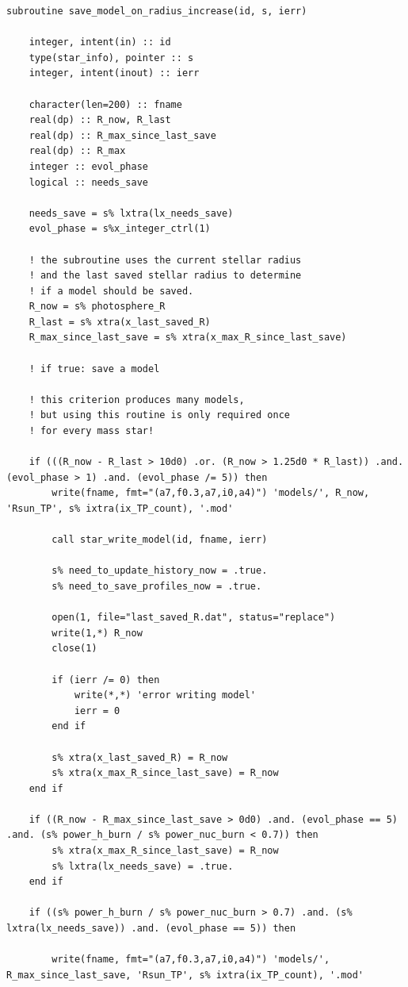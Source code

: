 \documentclass[a4paper,10pt]{article}
\begin{document}
\begin{verbatim}
subroutine save_model_on_radius_increase(id, s, ierr)

    integer, intent(in) :: id
    type(star_info), pointer :: s
    integer, intent(inout) :: ierr

    character(len=200) :: fname
    real(dp) :: R_now, R_last
    real(dp) :: R_max_since_last_save
    real(dp) :: R_max
    integer :: evol_phase
    logical :: needs_save

    needs_save = s% lxtra(lx_needs_save)
    evol_phase = s%x_integer_ctrl(1)

    ! the subroutine uses the current stellar radius 
    ! and the last saved stellar radius to determine
    ! if a model should be saved.
    R_now = s% photosphere_R
    R_last = s% xtra(x_last_saved_R)
    R_max_since_last_save = s% xtra(x_max_R_since_last_save)

    ! if true: save a model

    ! this criterion produces many models, 
    ! but using this routine is only required once
    ! for every mass star!
    
    if (((R_now - R_last > 10d0) .or. (R_now > 1.25d0 * R_last)) .and. (evol_phase > 1) .and. (evol_phase /= 5)) then
        write(fname, fmt="(a7,f0.3,a7,i0,a4)") 'models/', R_now, 'Rsun_TP', s% ixtra(ix_TP_count), '.mod'

        call star_write_model(id, fname, ierr)

        s% need_to_update_history_now = .true.
        s% need_to_save_profiles_now = .true.

        open(1, file="last_saved_R.dat", status="replace")
        write(1,*) R_now
        close(1)

        if (ierr /= 0) then
            write(*,*) 'error writing model'
            ierr = 0
        end if

        s% xtra(x_last_saved_R) = R_now
        s% xtra(x_max_R_since_last_save) = R_now
    end if

    if ((R_now - R_max_since_last_save > 0d0) .and. (evol_phase == 5) .and. (s% power_h_burn / s% power_nuc_burn < 0.7)) then
        s% xtra(x_max_R_since_last_save) = R_now
        s% lxtra(lx_needs_save) = .true.
    end if

    if ((s% power_h_burn / s% power_nuc_burn > 0.7) .and. (s% lxtra(lx_needs_save)) .and. (evol_phase == 5)) then

        write(fname, fmt="(a7,f0.3,a7,i0,a4)") 'models/', R_max_since_last_save, 'Rsun_TP', s% ixtra(ix_TP_count), '.mod'


\end{verbatim}
\end{document}

